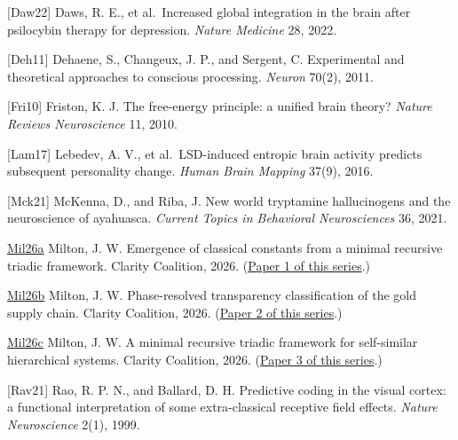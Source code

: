 \documentclass[12pt]{article}
\begin{document}
{[}Daw22{]} Daws, R. E., et al.~Increased global integration in the
brain after psilocybin therapy for depression. \emph{Nature Medicine}
28, 2022.

{[}Deh11{]} Dehaene, S., Changeux, J. P., and Sergent, C. Experimental
and theoretical approaches to conscious processing. \emph{Neuron} 70(2),
2011.

{[}Fri10{]} Friston, K. J. The free-energy principle: a unified brain
theory? \emph{Nature Reviews Neuroscience} 11, 2010.

{[}Lam17{]} Lebedev, A. V., et al.~LSD-induced entropic brain activity
predicts subsequent personality change. \emph{Human Brain Mapping}
37(9), 2016.

{[}Mck21{]} McKenna, D., and Riba, J. New world tryptamine hallucinogens
and the neuroscience of ayahuasca. \emph{Current Topics in Behavioral
Neurosciences} 36, 2021.

\href{https://github.com/baardev/truevalue/blob/main/docnav/Research/papers/1_recursive-tholonic-five-constants/1_recursive-tholonic-five-constants.pdf}{Mil26a}
Milton, J. W. Emergence of classical constants from a minimal recursive
triadic framework. Clarity Coalition, 2026.
(\href{https://github.com/baardev/truevalue/blob/main/docnav/Research/papers/1_recursive-tholonic-five-constants/1_recursive-tholonic-five-constants.pdf}{Paper
1 of this series}.)

\href{https://github.com/baardev/truevalue/blob/main/docnav/Research/papers/2_supply-chain-transparency-tvpci/2_supply-chain-transparency-tvpci.pdf}{Mil26b}
Milton, J. W. Phase-resolved transparency classification of the gold
supply chain. Clarity Coalition, 2026.
(\href{https://github.com/baardev/truevalue/blob/main/docnav/Research/papers/2_supply-chain-transparency-tvpci/2_supply-chain-transparency-tvpci.pdf}{Paper
2 of this series}.)

\href{https://github.com/baardev/truevalue/blob/main/docnav/Research/papers/3_minimal-recursive-triadic-framework/3_minimal-recursive-triadic-framework.pdf}{Mil26c}
Milton, J. W. A minimal recursive triadic framework for self-similar
hierarchical systems. Clarity Coalition, 2026.
(\href{https://github.com/baardev/truevalue/blob/main/docnav/Research/papers/3_minimal-recursive-triadic-framework/3_minimal-recursive-triadic-framework.pdf}{Paper
3 of this series}.)

{[}Rav21{]} Rao, R. P. N., and Ballard, D. H. Predictive coding in the
visual cortex: a functional interpretation of some extra-classical
receptive field effects. \emph{Nature Neuroscience} 2(1), 1999.
\end{document}

